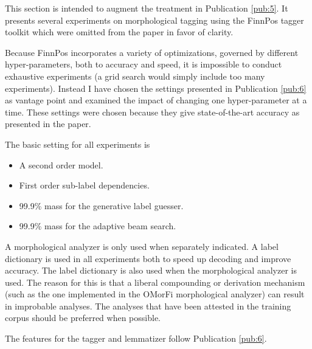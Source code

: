 This section is intended to augment the treatment
in Publication \ref{pub:5}. It presents several experiments on
morphological tagging using the FinnPos tagger toolkit which were
omitted from the paper in favor of clarity.

Because FinnPos incorporates a variety of optimizations, governed by
different hyper-parameters, both to accuracy and speed, it is
impossible to conduct exhaustive experiments (a grid search would
simply include too many experiments). Instead I have chosen the
settings presented in Publication \ref{pub:6} as vantage point and
examined the impact of changing one hyper-parameter at a time. These
settings were chosen because they give state-of-the-art accuracy as
presented in the paper. 

The basic setting for all experiments is 
\begin{itemize}
\item A second order model.
\item First order sub-label dependencies.
\item 99.9\% mass for the generative label guesser.
\item 99.9\% mass for the adaptive beam search.
\end{itemize}
A morphological analyzer is only used when separately indicated. A
label dictionary is used in all experiments both to speed up decoding
and improve accuracy. The label dictionary is also used when the
morphological analyzer is used. The reason for this is that a liberal
compounding or derivation mechanism (such as the one implemented in
the OMorFi morphological analyzer) can result in improbable
analyses. The analyses that have been attested in the training corpus
should be preferred when possible.

The features for the tagger and lemmatizer follow
Publication \ref{pub:6}.

